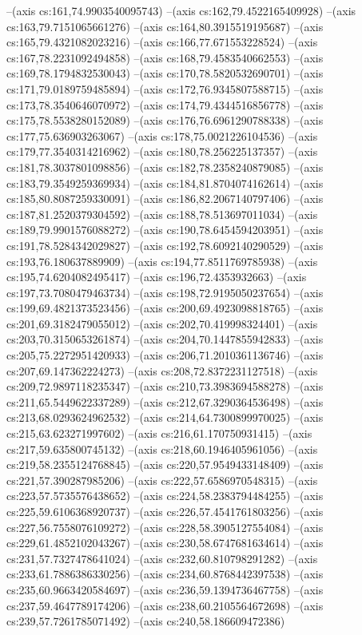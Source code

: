 --(axis cs:161,74.9903540095743)
--(axis cs:162,79.4522165409928)
--(axis cs:163,79.7151065661276)
--(axis cs:164,80.3915519195687)
--(axis cs:165,79.4321082023216)
--(axis cs:166,77.671553228524)
--(axis cs:167,78.2231092494858)
--(axis cs:168,79.4583540662553)
--(axis cs:169,78.1794832530043)
--(axis cs:170,78.5820532690701)
--(axis cs:171,79.0189759485894)
--(axis cs:172,76.9345807588715)
--(axis cs:173,78.3540646070972)
--(axis cs:174,79.4344516856778)
--(axis cs:175,78.5538280152089)
--(axis cs:176,76.6961290788338)
--(axis cs:177,75.636903263067)
--(axis cs:178,75.0021226104536)
--(axis cs:179,77.3540314216962)
--(axis cs:180,78.256225137357)
--(axis cs:181,78.3037801098856)
--(axis cs:182,78.2358240879085)
--(axis cs:183,79.3549259369934)
--(axis cs:184,81.8704074162614)
--(axis cs:185,80.8087259330091)
--(axis cs:186,82.2067140797406)
--(axis cs:187,81.2520379304592)
--(axis cs:188,78.513697011034)
--(axis cs:189,79.9901576088272)
--(axis cs:190,78.6454594203951)
--(axis cs:191,78.5284342029827)
--(axis cs:192,78.6092140290529)
--(axis cs:193,76.180637889909)
--(axis cs:194,77.8511769785938)
--(axis cs:195,74.6204082495417)
--(axis cs:196,72.4353932663)
--(axis cs:197,73.7080479463734)
--(axis cs:198,72.9195050237654)
--(axis cs:199,69.4821373523456)
--(axis cs:200,69.4923098818765)
--(axis cs:201,69.3182479055012)
--(axis cs:202,70.419998324401)
--(axis cs:203,70.3150653261874)
--(axis cs:204,70.1447855942833)
--(axis cs:205,75.2272951420933)
--(axis cs:206,71.2010361136746)
--(axis cs:207,69.147362224273)
--(axis cs:208,72.8372231127518)
--(axis cs:209,72.9897118235347)
--(axis cs:210,73.3983694588278)
--(axis cs:211,65.5449622337289)
--(axis cs:212,67.3290364536498)
--(axis cs:213,68.0293624962532)
--(axis cs:214,64.7300899970025)
--(axis cs:215,63.623271997602)
--(axis cs:216,61.170750931415)
--(axis cs:217,59.635800745132)
--(axis cs:218,60.1946405961056)
--(axis cs:219,58.2355124768845)
--(axis cs:220,57.9549433148409)
--(axis cs:221,57.390287985206)
--(axis cs:222,57.6586970548315)
--(axis cs:223,57.5735576438652)
--(axis cs:224,58.2383794484255)
--(axis cs:225,59.6106368920737)
--(axis cs:226,57.4541761803256)
--(axis cs:227,56.7558076109272)
--(axis cs:228,58.3905127554084)
--(axis cs:229,61.4852102043267)
--(axis cs:230,58.6747681634614)
--(axis cs:231,57.7327478641024)
--(axis cs:232,60.810798291282)
--(axis cs:233,61.7886386330256)
--(axis cs:234,60.8768442397538)
--(axis cs:235,60.9663420584697)
--(axis cs:236,59.1394736467758)
--(axis cs:237,59.4647789174206)
--(axis cs:238,60.2105564672698)
--(axis cs:239,57.7261785071492)
--(axis cs:240,58.186609472386)
